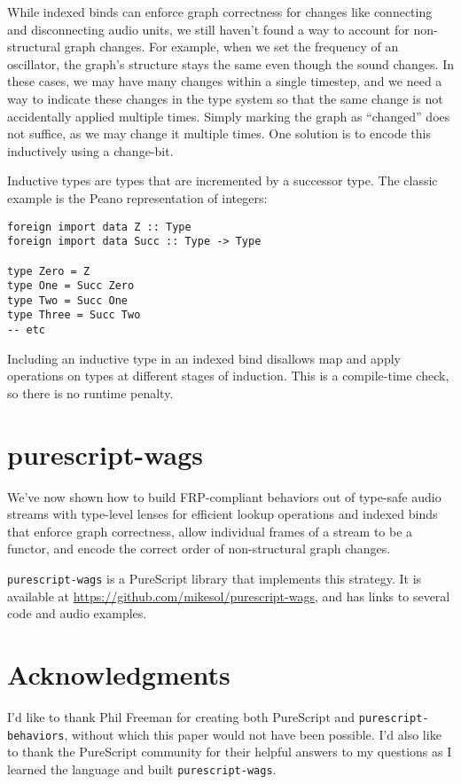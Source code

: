 \documentclass{sig-alternate}
\begin{document}
\begin{sloppypar}
  While indexed binds can enforce graph correctness for changes like connecting and disconnecting audio units, we still haven't found a way to account for non-structural graph changes. For example, when we set the frequency of an oscillator, the graph's structure stays the same even though the sound changes. In these cases, we may have many changes within a single timestep, and we need a way to indicate these changes in the type system so that the same change is not accidentally applied multiple times. Simply marking the graph as ``changed'' does not suffice, as we may change it multiple times.  One solution is to encode this inductively using a change-bit.

  Inductive types are types that are incremented by a successor type. The classic example is the Peano representation of integers:

  \begin{verbatim}
foreign import data Z :: Type
foreign import data Succ :: Type -> Type

type Zero = Z
type One = Succ Zero
type Two = Succ One
type Three = Succ Two
-- etc
  \end{verbatim}

  Including an inductive type in an indexed bind disallows map and apply operations on types at different stages of induction. This is a compile-time check, so there is no runtime penalty.

  \section{purescript-wags}
  
  We've now shown how to build FRP-compliant behaviors out of type-safe audio streams with type-level lenses for efficient lookup operations and indexed binds that enforce graph correctness, allow individual frames of a stream to be a functor, and encode the correct order of non-structural graph changes.

  \texttt{purescript-wags} is a PureScript library that implements this strategy. It is available at \url{https://github.com/mikesol/purescript-wags}, and has links to several code and audio examples.


  \section{Acknowledgments}
  I'd like to thank Phil Freeman for creating both PureScript and \texttt{purescript-behaviors}, without which this paper would not have been possible.  I'd also like to thank the PureScript community for their helpful answers to my questions as I learned the language and built \texttt{purescript-wags}.

  

\end{sloppypar}
\end{document}
